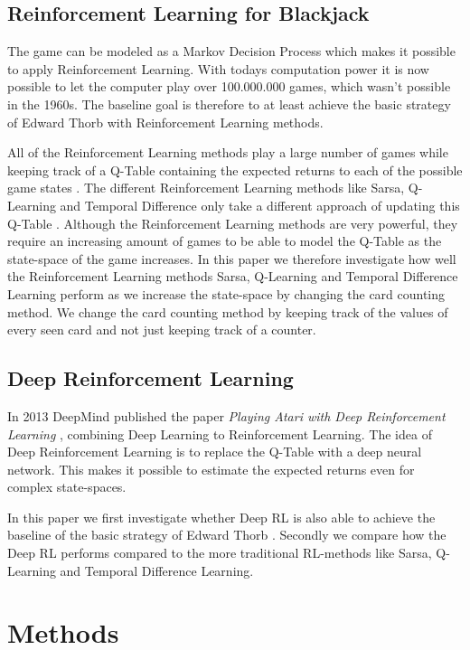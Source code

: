 \documentclass[conference]{IEEEtran}
\begin{document}
\subsection{Reinforcement Learning for Blackjack}
The game can be modeled as a Markov Decision Process which makes it possible to apply Reinforcement Learning.
With todays computation power it is now possible to let the computer play over 100.000.000 games, which wasn't possible in the 1960s. 
The baseline goal is therefore to at least achieve the basic strategy of Edward Thorb \cite{b1} with Reinforcement Learning methods.

All of the Reinforcement Learning methods play a large number of games while keeping track of a Q-Table containing the expected returns to each of the possible game states \cite{?}.
The different Reinforcement Learning methods like Sarsa, Q-Learning and Temporal Difference only take a different approach of updating this Q-Table \cite{?}.
Although the Reinforcement Learning methods are very powerful, they require an increasing amount of games to be able to model the Q-Table as the state-space of the game increases. 
In this paper we therefore investigate how well the Reinforcement Learning methods Sarsa, Q-Learning and Temporal Difference Learning perform as we increase the state-space by changing the card counting method. 
We change the card counting method by keeping track of the values of every seen card and not just keeping track of a counter. 

\subsection{Deep Reinforcement Learning}
In 2013 DeepMind published the paper \textit{Playing Atari with Deep Reinforcement Learning} \cite{b2}, combining Deep Learning to Reinforcement Learning.
The idea of Deep Reinforcement Learning is to replace the Q-Table with a deep neural network.
This makes it possible to estimate the expected returns even for complex state-spaces.

In this paper we first investigate whether Deep RL is also able to achieve the baseline of the basic strategy of Edward Thorb \cite{b1}.
Secondly we compare how the Deep RL performs compared to the more traditional RL-methods like Sarsa, Q-Learning and Temporal Difference Learning.



\section{Methods}
\end{document}

